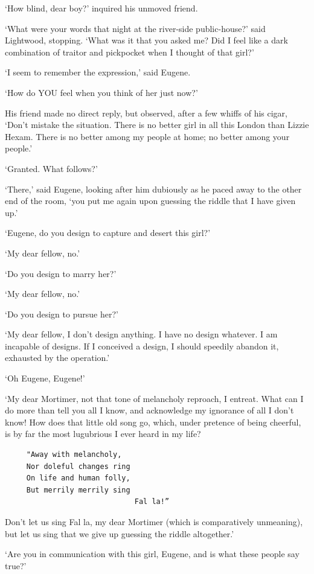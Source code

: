 ‘How blind, dear boy?’ inquired his unmoved friend.

‘What were your words that night at the river-side public-house?’ said
Lightwood, stopping. ‘What was it that you asked me? Did I feel like a
dark combination of traitor and pickpocket when I thought of that girl?’

‘I seem to remember the expression,’ said Eugene.

‘How do YOU feel when you think of her just now?’

His friend made no direct reply, but observed, after a few whiffs of his
cigar, ‘Don’t mistake the situation. There is no better girl in all this
London than Lizzie Hexam. There is no better among my people at home; no
better among your people.’

‘Granted. What follows?’

‘There,’ said Eugene, looking after him dubiously as he paced away to
the other end of the room, ‘you put me again upon guessing the riddle
that I have given up.’

‘Eugene, do you design to capture and desert this girl?’

‘My dear fellow, no.’

‘Do you design to marry her?’

‘My dear fellow, no.’

‘Do you design to pursue her?’

‘My dear fellow, I don’t design anything. I have no design whatever.
I am incapable of designs. If I conceived a design, I should speedily
abandon it, exhausted by the operation.’

‘Oh Eugene, Eugene!’

‘My dear Mortimer, not that tone of melancholy reproach, I entreat. What
can I do more than tell you all I know, and acknowledge my ignorance
of all I don’t know! How does that little old song go, which, under
pretence of being cheerful, is by far the most lugubrious I ever heard
in my life?

\begin{verbatim}
     "Away with melancholy,
     Nor doleful changes ring
     On life and human folly,
     But merrily merrily sing
                              Fal la!”
\end{verbatim}

Don’t let us sing Fal la, my dear Mortimer (which is comparatively
unmeaning), but let us sing that we give up guessing the riddle
altogether.’

‘Are you in communication with this girl, Eugene, and is what these
people say true?’

